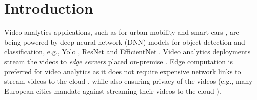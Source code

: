 
\section{Introduction}
\label{sec:intro}

Video analytics applications, such as for urban mobility   %
and smart cars \cite{bellevue-report}, are being powered by deep neural network (DNN) models %
for object detection and classification, e.g., Yolo \cite{yolo9000-1}, ResNet \cite{deepresidual-2} and EfficientNet \cite{efficientnet-3}. %
Video analytics deployments stream the videos to {\em edge servers} \cite{azure-ase, aws-outposts} placed on-premise \cite{ieee-computer, edgevideo-1, edgevideo-2, getmobile}. Edge computation is preferred for video analytics as it does not require expensive network links to stream videos to the cloud \cite{getmobile}, while also ensuring privacy of the videos (e.g., many European cities mandate against streaming their videos to the cloud \cite{sweden-data, azure-data}).

